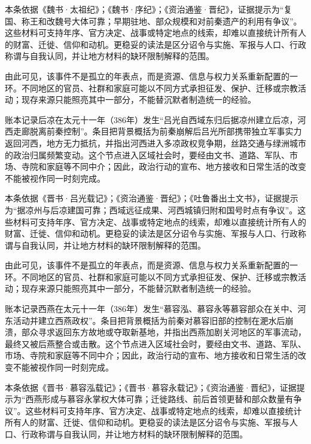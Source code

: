 本条依据《魏书·太祖纪》；《魏书·序纪》；《资治通鉴·晋纪》，证据提示为“复国、称王和改魏号大体可靠；早期驻地、部众规模和对前秦遗产的利用有争议”。这些材料可支持年序、官方决定、战事或特定地点的线索，却难以直接统计所有人的财富、迁徙、信仰和动机。更稳妥的读法是区分诏令与实施、军报与人口、行政称谓与自我认同，并让地方材料的缺环限制解释的范围。

由此可见，该事件不是孤立的年表点，而是资源、信息与权力关系重新配置的一环。不同地区的官员、社群和家庭可能以不同方式承担征发、保护、迁移或宗教活动；现存来源只能照亮其中一部分，不能替沉默者制造统一的经验。

账本记录后凉在太元十一年（386年）发生“吕光自西域东归后据凉州建立后凉，河西走廊脱离前秦控制”。条目把背景概括为前秦崩解后吕光所部携带独立军事实力返回河西，地方无力抵抗，并指出河西进入多凉政权竞争期，丝路交通与绿洲城市的政治归属频繁变动。这个节点进入区域社会时，要经由文书、道路、军队、市场、寺院和家庭等不同中介；因此，政治行动的宣布、地方接收和日常生活的改变不能被视作同一时刻完成。

本条依据《晋书·吕光载记》；《资治通鉴·晋纪》；《吐鲁番出土文书》，证据提示为“据凉州与后凉建国可靠；西域远征成果、河西城镇归附和国号时点有争议”。这些材料可支持年序、官方决定、战事或特定地点的线索，却难以直接统计所有人的财富、迁徙、信仰和动机。更稳妥的读法是区分诏令与实施、军报与人口、行政称谓与自我认同，并让地方材料的缺环限制解释的范围。

由此可见，该事件不是孤立的年表点，而是资源、信息与权力关系重新配置的一环。不同地区的官员、社群和家庭可能以不同方式承担征发、保护、迁移或宗教活动；现存来源只能照亮其中一部分，不能替沉默者制造统一的经验。

账本记录西燕在太元十一年（386年）发生“慕容泓、慕容永等慕容部众在关中、河东活动并建立西燕政权”。条目把背景概括为前秦对慕容旧部的控制在淝水后崩溃，部众寻求返回东方故地或夺取新基地，并指出西燕加剧关河地区的军事流动，最终又被后燕整合或击散。这个节点进入区域社会时，要经由文书、道路、军队、市场、寺院和家庭等不同中介；因此，政治行动的宣布、地方接收和日常生活的改变不能被视作同一时刻完成。

本条依据《晋书·慕容泓载记》；《晋书·慕容永载记》；《资治通鉴·晋纪》，证据提示为“西燕形成与慕容永掌权大体可靠；迁徙路线、前后首领更替和部众数量有争议”。这些材料可支持年序、官方决定、战事或特定地点的线索，却难以直接统计所有人的财富、迁徙、信仰和动机。更稳妥的读法是区分诏令与实施、军报与人口、行政称谓与自我认同，并让地方材料的缺环限制解释的范围。

